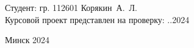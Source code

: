\begin{titlepage}
\begin{flushright}
    \begin{minipage}{9.3cm}
        Студент:  гр. 112601 Корякин~А.~Л.\\[0.1em]

        Курсовой проект представлен на проверку: \underline{\hspace*{1.4cm}}.\underline{\hspace*{1.4cm}}.2024\\
        \underline{\hspace*{5.6cm}}
        
    \end{minipage}
  \end{flushright}
  
  \vfill
  \begin{center}
    {\normalsize Минск 2024}
    \end{center}
\end{titlepage}
